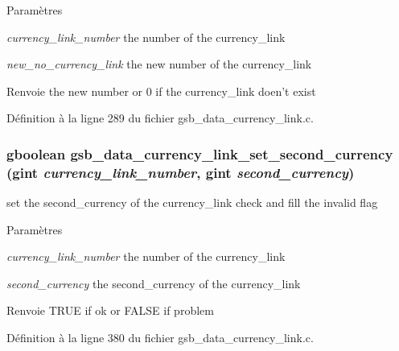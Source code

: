 \begin{DoxyParams}{Paramètres}
\item[{\em currency\_\-link\_\-number}]the number of the currency\_\-link \item[{\em new\_\-no\_\-currency\_\-link}]the new number of the currency\_\-link\end{DoxyParams}
\begin{DoxyReturn}{Renvoie}
the new number or 0 if the currency\_\-link doen't exist 
\end{DoxyReturn}


Définition à la ligne 289 du fichier gsb\_\-data\_\-currency\_\-link.c.

\subsubsection[{gsb\_\-data\_\-currency\_\-link\_\-set\_\-second\_\-currency}]{\setlength{\rightskip}{0pt plus 5cm}gboolean gsb\_\-data\_\-currency\_\-link\_\-set\_\-second\_\-currency (gint {\em currency\_\-link\_\-number}, \/  gint {\em second\_\-currency})}\label{gsb__data__currency__link_8h_ab8ecae95419928fd21f71f9f9e31e449}
set the second\_\-currency of the currency\_\-link check and fill the invalid flag


\begin{DoxyParams}{Paramètres}
\item[{\em currency\_\-link\_\-number}]the number of the currency\_\-link \item[{\em second\_\-currency}]the second\_\-currency of the currency\_\-link\end{DoxyParams}
\begin{DoxyReturn}{Renvoie}
TRUE if ok or FALSE if problem 
\end{DoxyReturn}


Définition à la ligne 380 du fichier gsb\_\-data\_\-currency\_\-link.c.


